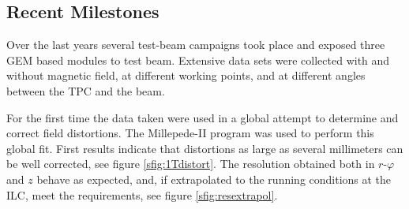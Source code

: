 \subsection{Recent Milestones}
Over the last years several test-beam campaigns took place and exposed three GEM based modules to test beam. Extensive data sets were collected with and without magnetic field, at different working points, and at different angles between the TPC and the beam.

For the first time the data taken were used in a global attempt to determine and correct field distortions. The Millepede-II \cite{Blobel20065,millepedeWiki} program was used to perform this global fit. First results indicate that distortions as large as several millimeters can be well corrected, see figure \ref{sfig:1Tdistort}. The resolution obtained both in $r\text{-}\varphi$ and $z$ behave as expected, and, if extrapolated to the running conditions at the ILC, meet the requirements, see figure \ref{sfig:resextrapol}.

